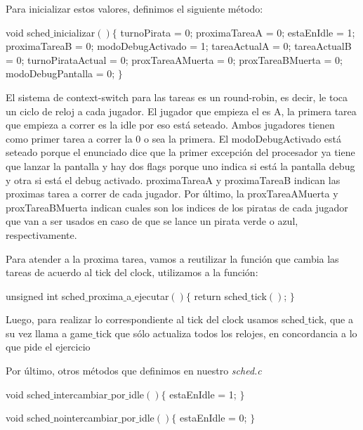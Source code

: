 Para inicializar estos valores, definimos el siguiente m\'etodo:
\begin{algorithmic}
    \State \tab void sched$\_$inicializar$() \{$
    \State \tab turnoPirata = 0;
    \State \tab proximaTareaA = 0;
    \State \tab estaEnIdle = 1;
    \State \tab proximaTareaB = 0;
    \State \tab modoDebugActivado = 1;
    \State \tab tareaActualA = 0;
    \State \tab tareaActualB = 0;
    \State \tab turnoPirataActual = 0;
    \State \tab proxTareaAMuerta = 0;
    \State \tab proxTareaBMuerta = 0;
    \State \tab modoDebugPantalla = 0; 
    \State \tab $\}$
\end{algorithmic}

El sistema de context-switch para las tareas es un round-robin, es decir, le toca un ciclo de reloj a cada jugador.
El jugador que empieza el es A, la primera tarea que empieza a correr es la idle por eso está seteado. Ambos jugadores tienen como primer tarea a correr la 0 o sea la primera. El modoDebugActivado está seteado porque el enunciado dice que la primer excepción del procesador ya tiene que lanzar la pantalla y hay dos flags porque uno indica si está la pantalla debug y otra si está el debug activado.
proximaTareaA y proximaTareaB indican las proximas tarea a correr de cada jugador. Por último, la proxTareaAMuerta y proxTareaBMuerta indican cuales son los indices de los piratas de cada jugador que van a ser usados en caso de que se lance un pirata verde o azul, respectivamente.

Para atender a la proxima tarea, vamos a reutilizar la funci\'on que cambia las tareas de acuerdo al tick del clock, utilizamos a la funci\'on:
\begin{algorithmic}
    \State \tab unsigned int sched$\_$proxima$\_$a$\_$ejecutar$() \{$
    \State \tab \tab return sched$\_$tick$()$;
    \State \tab $\}$
\end{algorithmic}

Luego, para realizar lo correspondiente al tick del clock usamos sched$\_$tick, que a su vez llama a game$\_$tick que sólo actualiza todos los relojes, en concordancia a lo que pide el ejercicio


Por \'ultimo, otros m\'etodos que definimos en nuestro \textit{sched.c}
\begin{algorithmic}
    \State \tab void sched$\_$intercambiar$\_$por$\_$idle$() \{$
        \State \tab \tab estaEnIdle = 1;
    \State \tab $\}$
\end{algorithmic}

\begin{algorithmic}
    \State \tab void sched$\_$nointercambiar$\_$por$\_$idle$() \{$
        \State \tab \tab estaEnIdle = 0;
    \State \tab $\}$
\end{algorithmic}

